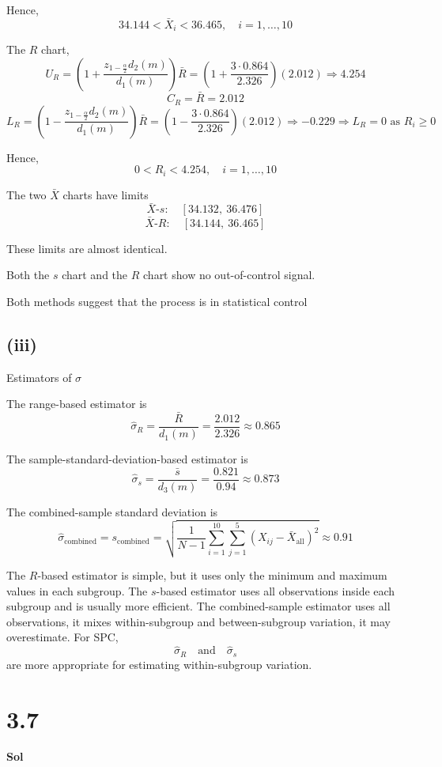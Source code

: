 \documentclass[a4paper, 12pt]{article}  %
\begin{document}
Hence,
$$
34.144<\bar X_i<36.465,\quad i=1,\ldots,10
$$

The \(R\) chart,
$$
U_R=\left(1+\frac{z_{1-\frac{\alpha}{2}}d_2(m)}{d_1(m)}\right)\bar R=\left(1+\frac{3\cdot 0.864}{2.326}\right)(2.012)\Rightarrow 4.254
$$
$$
C_R=\bar R=2.012
$$
$$
L_R=\left(1-\frac{z_{1-\frac{\alpha}{2}}d_2(m)}{d_1(m)}\right)\bar R=\left(1-\frac{3\cdot 0.864}{2.326}\right)(2.012)\Rightarrow -0.229\Rightarrow L_R=0 \text{ as } R_i\ge0
$$

Hence,
$$
0<R_i<4.254,\quad i=1,\ldots,10
$$

The two \(\bar X\) charts have limits
$$
\bar X\text{-}s:
\quad
[34.132,\ 36.476]
$$
$$
\bar X\text{-}R:
\quad
[34.144,\ 36.465]
$$

These limits are almost identical.

Both the \(s\) chart and the \(R\) chart show no out-of-control signal.

Both methods suggest that the process is in statistical control

\subsection*{(iii)}

Estimators of \(\sigma\)

The range-based estimator is
$$
\hat\sigma_R=\frac{\bar R}{d_1(m)}=\frac{2.012}{2.326}\approx 0.865
$$

The sample-standard-deviation-based estimator is
$$
\hat\sigma_s=\frac{\bar s}{d_3(m)}=\frac{0.821}{0.94}\approx 0.873
$$

The combined-sample standard deviation is
$$
\hat\sigma_{\mathrm{combined}}=s_{\mathrm{combined}}=\sqrt{\frac{1}{N-1}\sum_{i=1}^{10}\sum_{j=1}^{5}\left(X_{ij}-\bar X_{\mathrm{all}}\right)^2}\approx 0.91
$$

The $R$-based estimator is simple, 
but it uses only the minimum and maximum values in each subgroup.
The \(s\)-based estimator uses all observations inside each subgroup and is usually more efficient.
The combined-sample estimator uses all observations,
it mixes within-subgroup and between-subgroup variation,
it may overestimate.
For SPC,
$$
\hat\sigma_R
\quad\text{and}\quad
\hat\sigma_s
$$
are more appropriate for estimating within-subgroup variation.

\section*{3.7}
\textbf{Sol}
\end{document}
